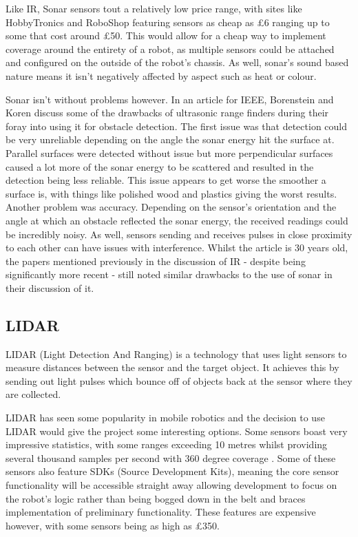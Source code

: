 				Like IR, Sonar sensors tout a relatively low price range, with sites like HobbyTronics and RoboShop featuring sensors as cheap as \pounds{6} ranging up to some that cost around \pounds{50}. This would allow for a cheap way to implement coverage around the entirety of a robot, as multiple sensors could be attached and configured on the outside of the robot's chassis. As well, sonar's sound based nature means it isn't negatively affected by aspect such as heat or colour. 
				
				Sonar isn't without problems however. In an article for IEEE, Borenstein and Koren\citep{borenstein1988obstacle} discuss some of the drawbacks of ultrasonic range finders during their foray into using it for obstacle detection. The first issue was that detection could be very unreliable depending on the angle the sonar energy hit the surface at. Parallel surfaces were detected without issue but more perpendicular surfaces caused a lot more of the sonar energy to be scattered and resulted in the detection being less reliable. This issue appears to get worse the smoother a surface is, with things like polished wood and plastics giving the worst results. Another problem was accuracy. Depending on the sensor's orientation and the angle at which an obstacle reflected the sonar energy, the received readings could be incredibly noisy. As well, sensors sending and receives pulses in close proximity to each other can have issues with interference. Whilst the article is 30 years old, the papers mentioned previously in the discussion of IR - despite being significantly more recent - still noted similar drawbacks to the use of sonar in their discussion of it\citep{do2013infrared}\cite{lee2011low}.
				
				\subsection{LIDAR}
				\label{litreview:lidar}
				LIDAR (Light Detection And Ranging) is a technology that uses light sensors to measure distances between the sensor and the target object. It achieves this by sending out light pulses which bounce off of objects back at the sensor where they are collected.
				
				LIDAR has seen some popularity in mobile robotics and the decision to use LIDAR would give the project some interesting options. Some sensors boast very impressive statistics, with some ranges exceeding 10 metres whilst providing several thousand samples per second with 360 degree coverage \citep{slamtecA1M8}. Some of these sensors also feature SDKs (Source Development Kits), meaning the core sensor functionality will be accessible straight away allowing development to focus on the robot's logic rather than being bogged down in the belt and braces implementation of preliminary functionality. These features are expensive however, with some sensors being as high as \pounds{350}.
				
